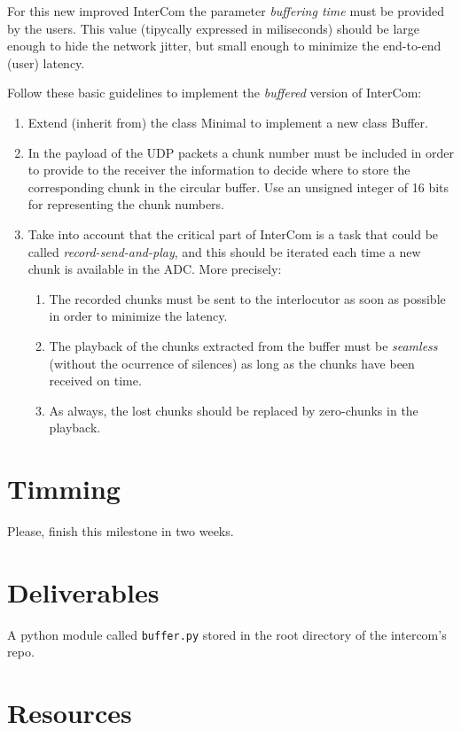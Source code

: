 For this new improved InterCom the parameter \emph{buffering time}
must be provided by the users. This value (tipycally expressed in
miliseconds) should be large enough to hide the network jitter, but
small enough to minimize the end-to-end (user) latency.

Follow these basic guidelines to implement the \emph{buffered} version
of InterCom:

\begin{enumerate}
\item Extend (inherit from) the class Minimal to implement a new class
  Buffer.
\item In the payload of the UDP packets a chunk number must be
  included in order to provide to the receiver the information to
  decide where to store the corresponding chunk in the circular
  buffer. Use an unsigned integer of 16 bits for representing the
  chunk numbers.
\item Take into account that the critical part of InterCom is a task
  that could be called \emph{record-send-and-play}, and this should be
  iterated each time a new chunk is available in the ADC. More
  precisely:
  \begin{enumerate}
  \item The recorded chunks must be sent to the interlocutor as soon
    as possible in order to minimize the latency.
  \item The playback of the chunks extracted from the buffer must be
    \emph{seamless} (without the ocurrence of silences) as long as the
    chunks have been received on time.
  \item As always, the lost chunks should be replaced by zero-chunks
    in the playback.
  \end{enumerate}
\end{enumerate}

\section{Timming}

Please, finish this milestone in two weeks.

\section{Deliverables}

A python module called \texttt{buffer.py} stored in the root directory
of the intercom's repo.

\section{Resources}


